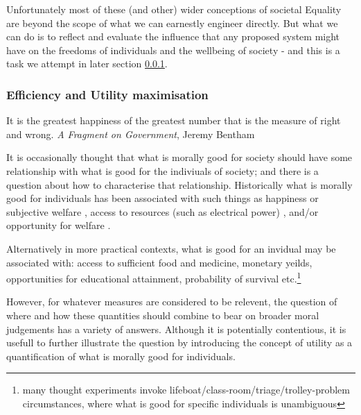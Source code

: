 Unfortunately most of these (and other) wider conceptions of societal Equality are beyond the scope of what we can earnestly engineer directly. But what we can do is to reflect and evaluate the influence that any proposed system might have on the freedoms of individuals and the wellbeing of society - and this is a task we attempt in later section \ref{}.

\subsubsection{Efficiency and Utility maximisation}


\begin{displayquote}It is the greatest happiness of the greatest number that is the measure of right and wrong. \textit{A Fragment on Government}, Jeremy Bentham\cite{bentham2001fragment}
\end{displayquote} 

It is occasionally thought that what is morally good for society should have some relationship with what is good for the indiviuals of society; and there is a question about how to characterise that relationship.
Historically what is morally good for individuals has been associated with such things as happiness \cite{burns2005happiness} or subjective welfare \cite{10.2307/2264894}, access to resources (such as electrical power) \cite{10.2307/2265047}, and/or opportunity for welfare \cite{10.2307/4320203}.%

Alternatively in more practical contexts, what is good for an invidual may be associated with: access to sufficient food and medicine, monetary yeilds, opportunities for educational attainment, probability of survival etc.\footnote{many thought experiments invoke lifeboat/class-room/triage/trolley-problem circumstances, where what is good for specific individuals is unambiguous}

However, for whatever measures are considered to be relevent, the question of where and how these quantities should combine to bear on broader moral judgements has a variety of answers.
Although it is potentially contentious, it is usefull to further illustrate the question by introducing the concept of utility as a quantification of what is morally good for individuals.

